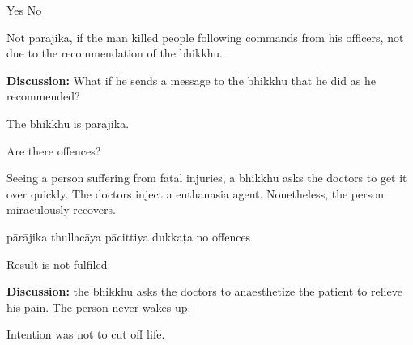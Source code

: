 \begin{exam}{\autoExamName}
\begin{problem*}
\begin{parts}
    \bigskip

    \begin{answers}{2}
      \bChoices
       Yes\eAns
       No\eAns
      \eChoices
    \end{answers}

    \bigskip

    \begin{solution}
      Not parajika, if the man killed people following commands from his officers, not due to the recommendation of the bhikkhu.
    \end{solution}

    \textbf{Discussion:} What if he sends a message to the bhikkhu that he did
    as he recommended?

    \begin{solution}
      The bhikkhu is parajika.
    \end{solution}

  \end{parts}

\end{problem*}

\begin{problem*}

  Are there offences?

\begin{parts}

  \item Seeing a person suffering from fatal injuries, a bhikkhu asks the doctors to
  get it over quickly. The doctors inject a euthanasia agent. Nonetheless, the person
  miraculously recovers.

  \bigskip

  \begin{answers}{5}
    \bChoices
     pārājika\eAns
     thullacāya\eAns
     pācittiya\eAns
     dukkaṭa\eAns
     no offences\eAns
    \eChoices
  \end{answers}

  \begin{solution}
    Result is not fulfiled.
  \end{solution}

  \bigskip

  \textbf{Discussion:} the bhikkhu asks the doctors to anaesthetize the patient to relieve his pain. The person never wakes up.

  \begin{solution}
    Intention was not to cut off life.
  \end{solution}


\end{parts}
\end{problem*}
\end{exam}
